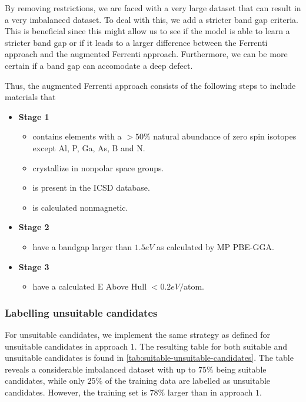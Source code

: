 By removing restrictions, we are faced with a very large dataset that can result in a very imbalanced dataset. To deal with this, we add a stricter band gap criteria. This is beneficial since this might allow us to see if the model is able to learn a stricter band gap or if it leads to a larger difference between the Ferrenti approach and the augmented Ferrenti approach. Furthermore, we can be more certain if a band gap can accomodate a deep defect. %

Thus, the augmented Ferrenti approach consists of the following steps to include materials that

\begin{itemize}
  \item[]{\textbf{Stage 1}}
  \begin{itemize}
  \item contains elements with a $>50\%$ natural abundance of zero spin isotopes except Al, P, Ga, As, B and N.
  \item crystallize in nonpolar space groups.
  \item is present in the ICSD database.
  \item is calculated nonmagnetic.
  \end{itemize}
  \item[]{\textbf{Stage 2}}
  \begin{itemize}
  \item have a bandgap larger than $1.5eV$ as calculated by MP PBE-GGA.
  \end{itemize}
  \item[]{\textbf{Stage 3}}
  \begin{itemize}
  \item have a calculated E Above Hull $<0.2eV/$atom.
  \end{itemize}
\end{itemize}

\subsubsection{Labelling unsuitable candidates}

For unsuitable candidates, we implement the same strategy as defined for unsuitable candidates in approach $1$. The resulting table for both suitable and unsuitable candidates is found in \autoref{tab:suitable-unsuitable-candidates}. The table reveals a considerable imbalanced dataset with up to $75 \%$ being suitable candidates, while only $25 \%$ of the training data are labelled as unsuitable candidates. However, the training set is $78 \%$ larger than in approach $1$.

